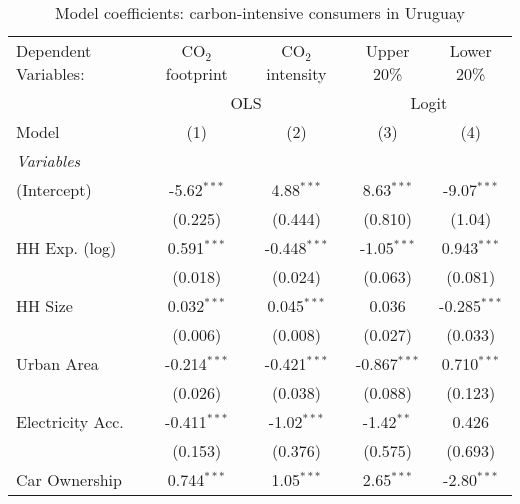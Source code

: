 
\begin{table}[htbp!]
   \centering
   \small
   \begin{adjustbox}{width = 1\textwidth, max height = 0.95\textheight, center}
      \begin{threeparttable}[b]
         \caption{\label{tab:Logit_1_URY} Model coefficients: carbon-intensive consumers in Uruguay}
         \begin{tabular}{lcccc}
            \tabularnewline \midrule \midrule
            Dependent Variables: & CO$_{2}$ footprint & CO$_{2}$ intensity & Upper 20\%     & Lower 20\%\\   
             & \multicolumn{2}{c}{OLS} & \multicolumn{2}{c}{Logit} \\ 
            Model                & (1)                & (2)                & (3)            & (4)\\  
            \midrule
            \emph{Variables}\\
            (Intercept)          & -5.62$^{***}$      & 4.88$^{***}$       & 8.63$^{***}$   & -9.07$^{***}$\\   
                                 & (0.225)            & (0.444)            & (0.810)        & (1.04)\\   
            HH Exp. (log)        & 0.591$^{***}$      & -0.448$^{***}$     & -1.05$^{***}$  & 0.943$^{***}$\\   
                                 & (0.018)            & (0.024)            & (0.063)        & (0.081)\\   
            HH Size              & 0.032$^{***}$      & 0.045$^{***}$      & 0.036          & -0.285$^{***}$\\   
                                 & (0.006)            & (0.008)            & (0.027)        & (0.033)\\   
            Urban Area           & -0.214$^{***}$     & -0.421$^{***}$     & -0.867$^{***}$ & 0.710$^{***}$\\   
                                 & (0.026)            & (0.038)            & (0.088)        & (0.123)\\   
            Electricity Acc.     & -0.411$^{***}$     & -1.02$^{***}$      & -1.42$^{**}$   & 0.426\\   
                                 & (0.153)            & (0.376)            & (0.575)        & (0.693)\\   
            Car Ownership        & 0.744$^{***}$      & 1.05$^{***}$       & 2.65$^{***}$   & -2.80$^{***}$\\   

\end{tabular}
\end{threeparttable}
\end{adjustbox}
\end{table}
